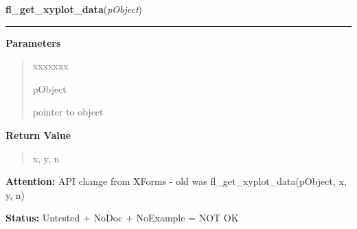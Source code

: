 \hspace{.8\funcindent}\begin{boxedminipage}{\funcwidth}

    \raggedright \textbf{fl\_get\_xyplot\_data}(\textit{pObject})

    \vspace{-1.5ex}

    \rule{\textwidth}{0.5\fboxrule}
\setlength{\parskip}{2ex}
\setlength{\parskip}{1ex}
      \textbf{Parameters}
      \vspace{-1ex}

      \begin{quote}
        \begin{Ventry}{xxxxxxx}

          \item[pObject]

          pointer to object

        \end{Ventry}

      \end{quote}

      \textbf{Return Value}
    \vspace{-1ex}

      \begin{quote}
      x, y, n

      \end{quote}

\textbf{Attention:} API change from XForms - old was fl\_get\_xyplot\_data(pObject, x, y, n)



\textbf{Status:} Untested + NoDoc + NoExample = NOT OK



    \end{boxedminipage}

    \label{xformslib:library:fl_get_xyplot_data_pointer}

    \vspace{0.5ex}

